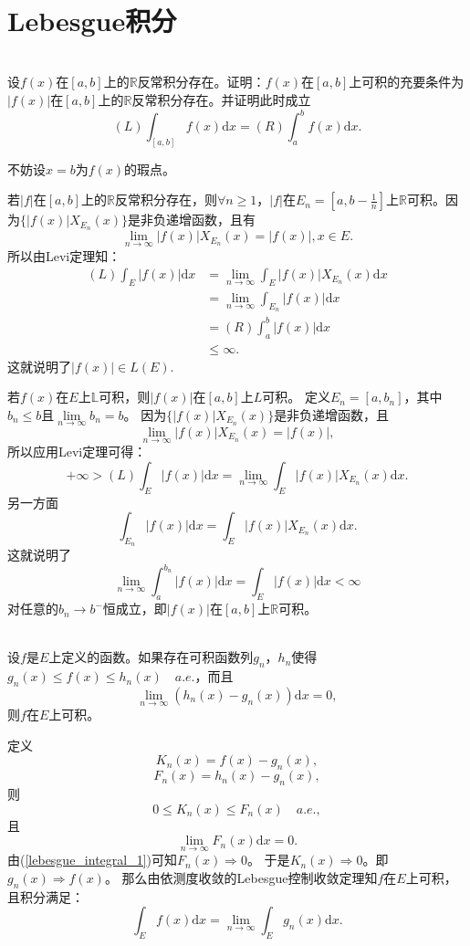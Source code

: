 \hfill\\
\section{Lebesgue积分}


\begin{exercise}
\hfill\\
设$f(x)$在$[a,b]$上的$\mathbb{R}$反常积分存在。证明：$f(x)$在$[a,b]$上可积的充要条件为$|f(x)|$在$[a,b]$上的$\mathbb{R}$反常积分存在。并证明此时成立$$(L)\int_{[a,b]}f(x)\mathrm{d}x=(R)\int_a^bf(x)\mathrm{d}x.$$


不妨设$x=b$为$f(x)$的瑕点。

若$|f|$在$[a,b]$上的$\mathbb{R}$反常积分存在，则$\forall n\geq1$，$|f|$在$E_n=[a,b-\frac{1}{n}]$上$\mathbb{R}$可积。因为$\{|f(x)|X_{E_n}(x)\}$是非负递增函数，且有$$\lim_{n\to\infty}|f(x)|X_{E_n}(x)=|f(x)|,x\in E.$$所以由Levi定理知：
\begin{align*}
(L)\int_E|f(x)|\mathrm{d}x&=\lim_{n\to\infty}\int_E|f(x)|X_{E_n}(x)\mathrm{d}x\\
&=\lim_{n\to\infty}\int_{E_n}|f(x)|\mathrm{d}x\\
&=(R)\int_a^b|f(x)|\mathrm{d}x\\
&\leq\infty.
\end{align*}
这就说明了$|f(x)|\in L(E).$

若$f(x)$在$E$上$\mathbb{L}$可积，则$|f(x)|$在$[a,b]$上$L$可积。
定义$E_n=[a,b_n]$，其中$b_n\leq b$且$\lim\limits_{n\to\infty}b_n=b$。
因为$\{|f(x)|X_{E_n}(x)\}$是非负递增函数，且
$$\lim_{n\to\infty}|f(x)|X_{E_n}(x)=|f(x)|,$$
所以应用Levi定理可得：
$$+\infty>(L)\int_E|f(x)|\mathrm{d}x=\lim_{n\to\infty}\int_E|f(x)|X_{E_n}(x)\mathrm{d}x.$$
另一方面$$\int_{E_n}|f(x)|\mathrm{d}x=\int_E|f(x)|X_{E_n}(x)\mathrm{d}x.$$
这就说明了$$\lim_{n\to\infty}\int_a^{b_n}|f(x)|\mathrm{d}x=\int_E|f(x)|\mathrm{d}x<\infty$$
对任意的$b_n\to b^-$恒成立，即$|f(x)|$在$[a,b]$上$\mathbb{R}$可积。
\end{exercise}



\begin{exercise}
\hfill\\
设$f$是$E$上定义的函数。如果存在可积函数列$g_n$，$h_n$使得$g_n(x)\leq f(x)\leq h_n(x)\quad a.e.$，而且
$$\lim_{n\to\infty}(h_n(x)-g_n(x))\mathrm{d}x=0,$$
则$f$在$E$上可积。


定义$$K_n(x)=f(x)-g_n(x),$$
$$F_n(x)=h_n(x)-g_n(x),$$
则
$$0\leq K_n(x)\leq F_n(x)\quad a.e.,$$
且
\begin{equation}\label{lebesgue_integral_1}
\lim_{n\to\infty}F_n(x)\mathrm{d}x=0.
\end{equation}
由(\ref{lebesgue_integral_1})可知$F_n(x)\Rightarrow0$。
于是$K_n(x)\Rightarrow0$。即$g_n(x)\Rightarrow f(x)$。
那么由依测度收敛的Lebesgue控制收敛定理知$f$在$E$上可积，且积分满足：
$$\int_Ef(x)\mathrm{d}x=\lim_{n\to\infty}\int_Eg_n(x)\mathrm{d}x.$$
\end{exercise}



